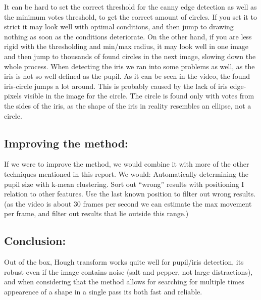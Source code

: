 It can be hard to set the correct threshold for the canny edge detection
as well as the minimum votes threshold, to get the correct amount of
circles. If you set it to strict it may look well with optimal
conditions, and then jump to drawing nothing as soon as the conditions
deteriorate. On the other hand, if you are less rigid with the
thresholding and min/max radius, it may look well in one image and then
jump to thousands of found circles in the next image, slowing down the
whole process. When detecting the iris we ran into some problems as
well, as the iris is not so well defined as the pupil. As it can be seen
in the video, the found iris-circle jumps a lot around. This is probably
caused by the lack of iris edge-pixels visible in the image for the
circle. The circle is found only with votes from the sides of the iris,
as the shape of the iris in reality resembles an ellipse, not a circle.

\subsection{Improving the method:}

If we were to improve the method, we would combine it with more of the
other techniques mentioned in this report. We would: Automatically
determining the pupil size with k-mean clustering. Sort out ``wrong''
results with positioning I relation to other features. Use the last
known position to filter out wrong results. (as the video is about 30
frames per second we can estimate the max movement per frame, and filter
out results that lie outside this range.)

\subsection{Conclusion:}

Out of the box, Hough transform works quite well for pupil/iris
detection, its robust even if the image contains noise (salt and pepper,
not large distractions), and when considering that the method allows for
searching for multiple times appearence of a shape in a single pass its
both fast and reliable.
